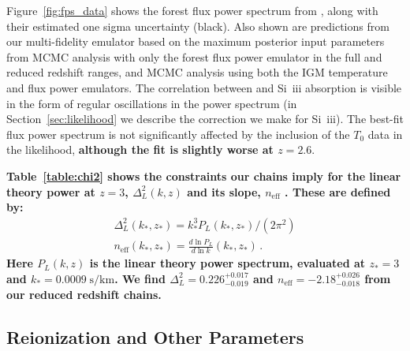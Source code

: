 Figure~\ref{fig:fps_data} shows the \lya forest flux power spectrum from \cite{2019JCAP...07..017C}, along with their estimated one sigma uncertainty (black).
Also shown are predictions from our multi-fidelity emulator based on the maximum posterior input parameters from MCMC analysis with only the \lya forest flux power emulator in the full and reduced redshift ranges, and MCMC analysis using both the IGM temperature and flux power emulators.
The correlation between \lya and Si~{\sc iii} absorption is visible in the form of regular oscillations in the power spectrum (in Section~\ref{sec:likelihood} we describe the correction we make for Si~{\sc iii}).
The best-fit flux power spectrum is not significantly affected by the inclusion of the $T_0$ data in the likelihood, \textbf{although the fit is slightly worse at $z=2.6$}. %

\textbf{Table~\ref{table:chi2} shows the constraints our chains imply for the linear theory power at $z=3$, $\Delta_L^2(k,z)$ and its slope, $n_\mathrm{eff}$ \cite{2005ApJ...635..761M, 2019JCAP...07..017C, 2023ApJ...944..223P}. These are defined by:}
\begin{align}
 \Delta_L^2(k_*, z_*) = k_*^3 P_L(k_*,z_*) / (2\pi^2) \\
 n_\mathrm{eff}(k_*, z_*) = \frac{d \ln P_L}{d \ln k} (k_*, z_*)\,.
\end{align}
\textbf{Here $P_L(k,z)$ is the linear theory power spectrum, evaluated at $z_* = 3$ and $k_* = 0.0009\;\mathrm{s/km}$. We find $\Delta_L^2 = 0.226^{+0.017}_{-0.019}$ and $n_\mathrm{eff} = -2.18^{+0.026}_{-0.018}$ from our reduced redshift chains.}


\subsection{Reionization and Other Parameters}\label{sec:astro}

